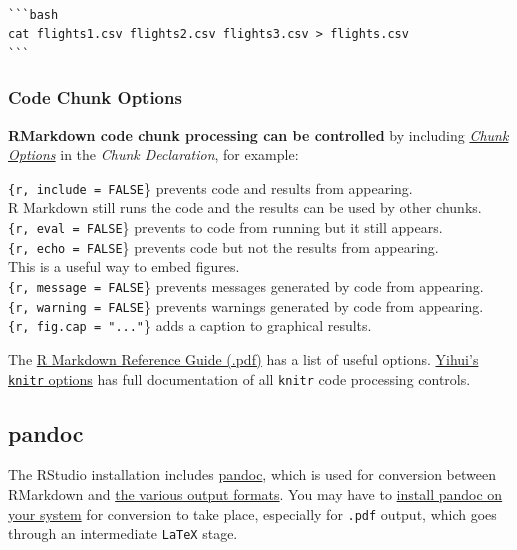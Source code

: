 \documentclass[]{book}
\theoremstyle{definition}
\theoremstyle{definition}
\theoremstyle{definition}
\theoremstyle{remark}
\begin{document}
\begin{verbatim}

```bash
cat flights1.csv flights2.csv flights3.csv > flights.csv
```
\end{verbatim}

\hypertarget{code-chunk-options}{%
\subsubsection{Code Chunk Options}\label{code-chunk-options}}

\textbf{RMarkdown code chunk processing can be controlled} by including
\href{https://rmarkdown.rstudio.com/lesson-3.html}{\emph{Chunk Options}}
in the \emph{Chunk Declaration}, for example:

\texttt{\{r,\ include\ =\ FALSE}\} prevents code and results from
appearing.\\
R Markdown still runs the code and the results can be used by other
chunks.\\
\texttt{\{r,\ eval\ =\ FALSE}\} prevents to code from running but it
still appears. \texttt{\{r,\ echo\ =\ FALSE}\} prevents code but not the
results from appearing.\\
This is a useful way to embed figures.\\
\texttt{\{r,\ message\ =\ FALSE}\} prevents messages generated by code
from appearing.\\
\texttt{\{r,\ warning\ =\ FALSE}\} prevents warnings generated by code
from appearing.\\
\texttt{\{r,\ fig.cap\ =\ "..."}\} adds a caption to graphical results.

The
\href{https://www.rstudio.com/wp-content/uploads/2015/03/rmarkdown-reference.pdf}{R
Markdown Reference Guide (.pdf)} has a list of useful options.
\href{https://yihui.name/knitr/options/}{Yihui's \texttt{knitr} options}
has full documentation of all \texttt{knitr} code processing controls.

\hypertarget{pandoc}{%
\subsection{pandoc}\label{pandoc}}

The RStudio installation includes \href{http://pandoc.org/}{pandoc},
which is used for conversion between RMarkdown and
\href{https://rmarkdown.rstudio.com/formats.html}{the various output
formats}. You may have to
\href{http://pandoc.org/installing.html}{install pandoc on your system}
for conversion to take place, especially for \texttt{.pdf} output, which
goes through an intermediate \texttt{LaTeX} stage.
\end{document}
